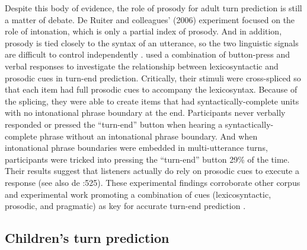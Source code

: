 \documentclass[authoryear, 12pt]{elsarticle}
\begin{document}
Despite this body of evidence, the role of prosody for adult turn prediction is still a matter of debate. De Ruiter and colleagues' (2006) experiment focused on the role of intonation, which is only a partial index of prosody. And in addition, prosody is tied closely to the syntax of an utterance, so the two linguistic signals are difficult to control independently \citep{ford1996}. \citet*{torreira2015} used a combination of button-press and verbal responses to investigate the relationship between lexicosyntactic and prosodic cues in turn-end prediction. Critically, their stimuli were cross-spliced so that each item had full prosodic cues to accompany the lexicosyntax. Because of the splicing, they were able to create items that had syntactically-complete units with no intonational phrase boundary at the end. Participants never verbally responded or pressed the ``turn-end'' button when hearing a syntactically-complete phrase without an intonational phrase boundary. And when intonational phrase boundaries were embedded in multi-utterance turns, participants were tricked into pressing the ``turn-end'' button 29\% of the time. Their results suggest that listeners actually do rely on prosodic cues to execute a response (see also de \citet{de-ruiter2006}:525). These experimental findings corroborate other corpus and experimental work promoting a combination of cues (lexicosyntactic, prosodic, and pragmatic) as key for accurate turn-end prediction \citep{duncan1972, ford1996, hirvenkari2013}. 

\subsection{Children's turn prediction}


\end{document}
